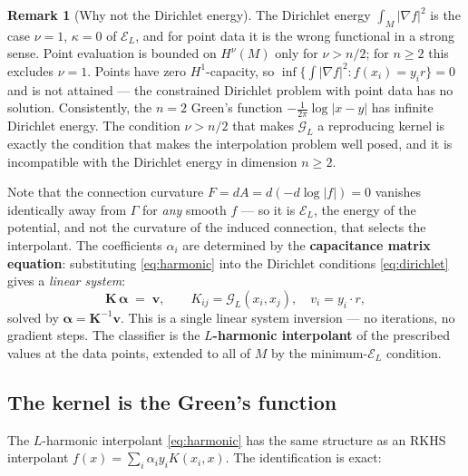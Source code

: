 \documentclass[11pt, a4paper]{article}
\theoremstyle{plain}
\theoremstyle{definition}
\newtheorem{remark}[theorem]{Remark}
\newcommand{\Gam}{\Gamma}
\newcommand{\Gr}{\mathcal{G}}   %
\begin{document}
\begin{remark}[Why not the Dirichlet energy]\label{rem:not-dirichlet}
The Dirichlet energy $\int_M|\nabla f|^2$ is the case $\nu = 1$, $\kappa = 0$ of
$\mathcal{E}_L$, and for point data it is the wrong functional in a strong sense.
Point evaluation is bounded on $H^\nu(M)$ only for $\nu > n/2$; for $n \geq 2$
this excludes $\nu = 1$. Points have zero $H^1$-capacity, so
$\inf\{\int|\nabla f|^2 : f(x_i) = y_i r\} = 0$ and is not attained --- the
constrained Dirichlet problem with point data has no solution. Consistently, the
$n=2$ Green's function $-\tfrac{1}{2\pi}\log|x-y|$ has infinite Dirichlet energy.
The condition $\nu > n/2$ that makes $\Gr_L$ a reproducing kernel is exactly the
condition that makes the interpolation problem well posed, and it is incompatible
with the Dirichlet energy in dimension $n \geq 2$.
\end{remark}

Note that the connection curvature $F = dA = d(-d\log|f|) = 0$ vanishes
identically away from $\Gam$ for \emph{any} smooth $f$ --- so it is
$\mathcal{E}_L$, the energy of the potential, and not the curvature of the
induced connection, that selects the interpolant. The coefficients $\alpha_i$
are determined by the \textbf{capacitance matrix equation}: substituting
\eqref{eq:harmonic} into the Dirichlet conditions \eqref{eq:dirichlet} gives a
\emph{linear system}:
\begin{equation}\label{eq:capacitance}
  \mathbf{K}\,\boldsymbol{\alpha} \;=\; \mathbf{v},
  \qquad K_{ij} = \Gr_L(x_i, x_j),\quad v_i = y_i \cdot r,
\end{equation}
solved by $\boldsymbol{\alpha} = \mathbf{K}^{-1}\mathbf{v}$. This is a single
linear system inversion --- no iterations, no gradient steps. The classifier is
the \textbf{$L$-harmonic interpolant} of the prescribed values at the data
points, extended to all of $M$ by the minimum-$\mathcal{E}_L$ condition.

\subsection{The kernel is the Green's function}\label{subsec:kernel}

The $L$-harmonic interpolant \eqref{eq:harmonic} has the same structure as an RKHS
interpolant $f(x) = \sum_i \alpha_i y_i K(x_i,x)$. The identification is exact:
\end{document}

